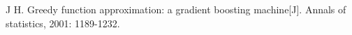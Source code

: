 \documentclass[a4paper,11pt,         %
               ]{article}
\begin{document}


\begin{thebibliography}{}
\bibitemFriedman J H. Greedy function approximation: a gradient boosting machine[J]. Annals of statistics, 2001: 1189-1232.
\end{thebibliography}
\clearpage
\end{document}
